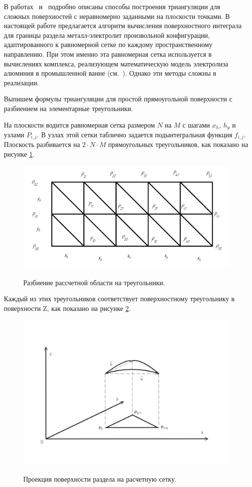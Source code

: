 \documentclass{article}
\begin{document}
В работах~\cite{litlink:scvortsov} и~\cite{litlink:shirok} подробно описаны способы построения триангуляции для сложных поверхностей с неравномерно заданными на плоскости точками. В настоящей работе предлагается алгоритм вычисления поверхностного интеграла для границы раздела металл-электролит произвольной конфигурации, адаптированного к равномерной сетке по каждому пространственному направлению. При этом именно эта равномерная сетка используется в вычислениях комплекса, реализующем математическую модель электролиза алюминия в промышленной ванне (см.~\cite{litlink:kalmykov}). Однако эти методы сложны в реализации.

Выпишем формулы триангуляции для простой прямоугольной поверхности с разбиением на элементарные треугольники.

На плоскости водится равномерная сетка размером $N$ на $M$ с шагами $x_h$, $h_y$ и узлами $P_{i,j}$. В узлах этой сетки таблично задается подынтегральная функция $f_{i,j}$. Плоскость разбивается на $2 \cdot N \cdot M$ прямоугольных треугольников, как показано на рисунке \ref{fig:grid}.

\begin{figure}[H]
\centering
\includegraphics[width=0.8\linewidth]{Сетка.png}
\caption{}
\label{fig:grid}
Разбиение рассчетной области на треугольники.
\end{figure}

Каждый из этих треугольников соответствует поверхностному треугольнику в поверхности Z, как показано на рисунке \ref{fig:triangle}.

\begin{figure}[H]
\centering
\includegraphics[width=0.8\linewidth]{Triangle.jpg}
\caption{}
\label{fig:triangle}
Проекция поверхности раздела на расчетную сетку.
\end{figure}
\end{document}
